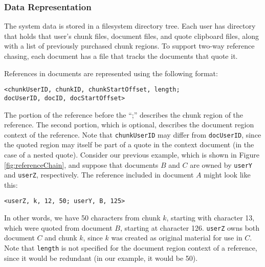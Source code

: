 \documentclass{acm_proc_article-sp}
\begin{document}
\subsubsection{Data Representation}
The system data is stored in a filesystem directory tree.
Each user has directory that holds that user's chunk files, document files, and quote clipboard files, along with a list of previously purchased chunk regions.
To support two-way reference chasing, each document has a file that tracks the documents that quote it.

References in documents are represented using the following format:
\begin{center}
\texttt{<chunkUserID, chunkID, chunkStartOffset, length;\\ 
docUserID, docID, docStartOffset>} 
\end{center}
The portion of the reference before the ``;'' describes the chunk region of the reference.  
The second portion, which is optional, describes the document region context of the reference.  
Note that \texttt{chunkUserID} may differ from \texttt{docUserID}, since the quoted region may itself be part of a quote in the context document (in the case of a nested quote).
Consider our previous example, which is shown in Figure \ref{fig:referenceChain}, and suppose that documents $B$ and  $C$ are owned by \texttt{userY} and \texttt{userZ}, respectively.
The reference included in document $A$ might look like this:
\begin{center}
\texttt{<userZ, k, 12, 50; userY, B, 125>} 
\end{center}
In other words, we have 50 characters from chunk $k$, starting with character 13, which were quoted from document $B$, starting at character 126.
\texttt{userZ} owns both document $C$ and chunk $k$, since $k$ was created as original material for use in $C$.
Note that \texttt{length} is not specified for the document region context of a reference, since it would be redundant (in our example, it would be 50).

\end{document}
